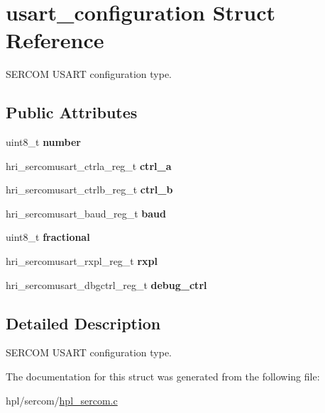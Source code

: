\hypertarget{structusart__configuration}{}\section{usart\+\_\+configuration Struct Reference}
\label{structusart__configuration}


S\+E\+R\+C\+OM U\+S\+A\+RT configuration type.  


\subsection*{Public Attributes}
\begin{DoxyCompactItemize}
\item 
\mbox{\label{structusart__configuration_a7dfb41dd21aa3cca0509c5b57a2d8c06}} 
uint8\+\_\+t {\bfseries number}
\item 
\mbox{\label{structusart__configuration_a7bdd8c053d1b4b9317c056acae14dcd6}} 
hri\+\_\+sercomusart\+\_\+ctrla\+\_\+reg\+\_\+t {\bfseries ctrl\+\_\+a}
\item 
\mbox{\label{structusart__configuration_a26b2718e5f87b09120626f1ed41cfdac}} 
hri\+\_\+sercomusart\+\_\+ctrlb\+\_\+reg\+\_\+t {\bfseries ctrl\+\_\+b}
\item 
\mbox{\label{structusart__configuration_a175aa070b37b79923cc3705bb36f8fce}} 
hri\+\_\+sercomusart\+\_\+baud\+\_\+reg\+\_\+t {\bfseries baud}
\item 
\mbox{\label{structusart__configuration_a4a71d8844289814745a0a1c8c5e46513}} 
uint8\+\_\+t {\bfseries fractional}
\item 
\mbox{\label{structusart__configuration_a7b11e3b9e86dabbc5d4161dafcd6bfb0}} 
hri\+\_\+sercomusart\+\_\+rxpl\+\_\+reg\+\_\+t {\bfseries rxpl}
\item 
\mbox{\label{structusart__configuration_a20a3a6002d7824cab91216ef91a4e350}} 
hri\+\_\+sercomusart\+\_\+dbgctrl\+\_\+reg\+\_\+t {\bfseries debug\+\_\+ctrl}
\end{DoxyCompactItemize}


\subsection{Detailed Description}
S\+E\+R\+C\+OM U\+S\+A\+RT configuration type. 

The documentation for this struct was generated from the following file\+:\begin{DoxyCompactItemize}
\item 
hpl/sercom/\hyperlink{hpl__sercom_8c}{hpl\+\_\+sercom.\+c}\end{DoxyCompactItemize}
